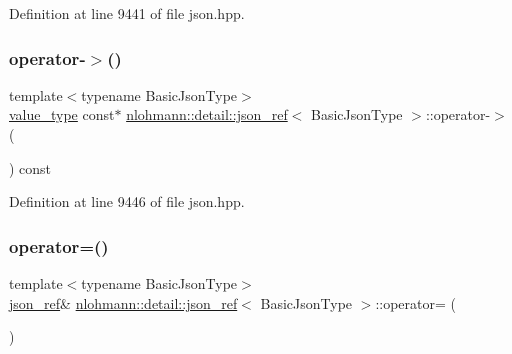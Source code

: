 Definition at line 9441 of file json.\+hpp.

\mbox{\label{classnlohmann_1_1detail_1_1json__ref_adb652774a67829876449dc0b30637456}} 
\subsubsection{\texorpdfstring{operator-\/$>$()}{operator->()}}
{\footnotesize\ttfamily template$<$typename Basic\+Json\+Type$>$ \\
\mbox{\hyperlink{classnlohmann_1_1detail_1_1json__ref_a78d76cf288141049568c0d670ed670ef}{value\+\_\+type}} const$\ast$ \mbox{\hyperlink{classnlohmann_1_1detail_1_1json__ref}{nlohmann\+::detail\+::json\+\_\+ref}}$<$ Basic\+Json\+Type $>$\+::operator-\/$>$ (\begin{DoxyParamCaption}{ }\end{DoxyParamCaption}) const\hspace{0.3cm}{\ttfamily [inline]}}



Definition at line 9446 of file json.\+hpp.

\mbox{\label{classnlohmann_1_1detail_1_1json__ref_a98956ba676b1ae16b62346f9c4fb752e}} 
\subsubsection{\texorpdfstring{operator=()}{operator=()}\hspace{0.1cm}{\footnotesize\ttfamily [1/2]}}
{\footnotesize\ttfamily template$<$typename Basic\+Json\+Type$>$ \\
\mbox{\hyperlink{classnlohmann_1_1detail_1_1json__ref}{json\+\_\+ref}}\& \mbox{\hyperlink{classnlohmann_1_1detail_1_1json__ref}{nlohmann\+::detail\+::json\+\_\+ref}}$<$ Basic\+Json\+Type $>$\+::operator= (\begin{DoxyParamCaption}\item[{const \mbox{\hyperlink{classnlohmann_1_1detail_1_1json__ref}{json\+\_\+ref}}$<$ Basic\+Json\+Type $>$ \&}]{ }\end{DoxyParamCaption})\hspace{0.3cm}{\ttfamily [delete]}}

